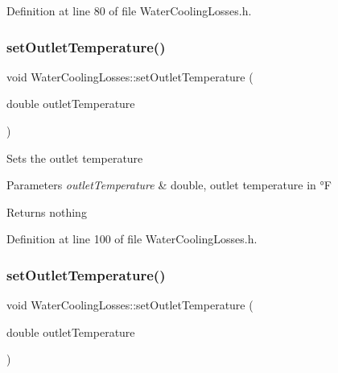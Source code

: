 Definition at line 80 of file Water\+Cooling\+Losses.\+h.

\mbox{\label{class_water_cooling_losses_a36bb100df0580a78f63f266cdc1d41f5}} 
\subsubsection{\texorpdfstring{set\+Outlet\+Temperature()}{setOutletTemperature()}\hspace{0.1cm}{\footnotesize\ttfamily [1/3]}}
{\footnotesize\ttfamily void Water\+Cooling\+Losses\+::set\+Outlet\+Temperature (\begin{DoxyParamCaption}\item[{double}]{outlet\+Temperature }\end{DoxyParamCaption})\hspace{0.3cm}{\ttfamily [inline]}}

Sets the outlet temperature


\begin{DoxyParams}{Parameters}
{\em outlet\+Temperature} & double, outlet temperature in °F\\
\hline
\end{DoxyParams}
\begin{DoxyReturn}{Returns}
nothing 
\end{DoxyReturn}


Definition at line 100 of file Water\+Cooling\+Losses.\+h.

\mbox{\label{class_water_cooling_losses_a36bb100df0580a78f63f266cdc1d41f5}} 
\subsubsection{\texorpdfstring{set\+Outlet\+Temperature()}{setOutletTemperature()}\hspace{0.1cm}{\footnotesize\ttfamily [2/3]}}
{\footnotesize\ttfamily void Water\+Cooling\+Losses\+::set\+Outlet\+Temperature (\begin{DoxyParamCaption}\item[{double}]{outlet\+Temperature }\end{DoxyParamCaption})\hspace{0.3cm}{\ttfamily [inline]}}

